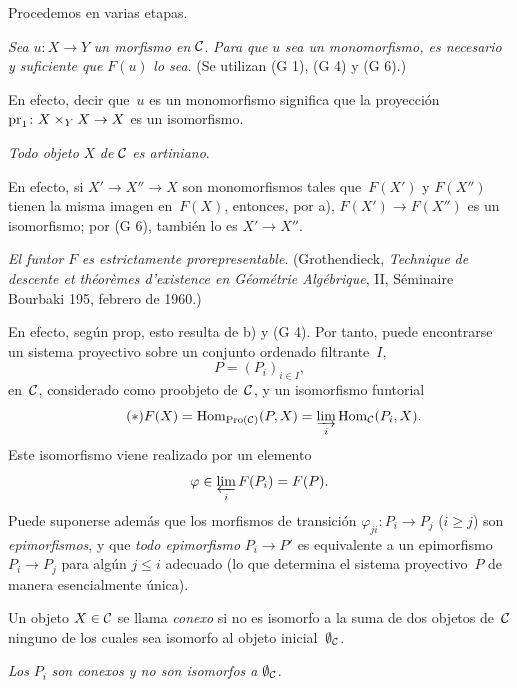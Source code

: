 Procedemos en varias etapas.
\begin{enumerateb}
\item[a)] \emph{Sea} $u\colon X\to Y$ \emph{un morfismo en} $\cal{C}$.
\emph{Para que} $u$ \emph{sea un monomorfismo, es necesario y suficiente que}
$F(u)$ \emph{lo sea}. (Se utilizan (G 1), (G 4) y (G 6).)

En efecto, decir que~$u$ es un monomorfismo significa que la proyección
$\pr_1\colon X\times_YX\to X$ es un isomorfismo.

\item[b)] \emph{Todo objeto} $X$ \emph{de} $\cal{C}$ \emph{es artiniano}.

En efecto, si $X'\to X''\to X$ son monomorfismos tales que~$F(X')$ y
$F(X'')$ tienen la misma imagen en~$F(X)$, entonces, por a),
$F(X')\to F(X'')$ es un isomorfismo; por (G 6), también lo es
$X'\to X''$.

\item[c)] \emph{El funtor} $F$ \emph{es estrictamente prorepresentable}.
(\cf Grothendieck, \emph{Technique de descente et théorèmes d'existence en
Géométrie Algébrique}, II, Séminaire Bourbaki 195, febrero de 1960.)

En efecto, según \loccit prop\ptbl {}, esto resulta de b) y (G 4).
Por tanto, puede encontrarse un sistema proyectivo sobre un conjunto ordenado
filtrante~$I$,
$$
P=(P_i)_{i\in I},
$$
%
en~$\cal{C}$, considerado como proobjeto de~$\cal{C}$, y un isomorfismo
funtorial
\begin{equation*}
\label{eq:V.4.*}\tag{$*$}
F(X)=\Hom_{\Pro(\cal{C})}(P,X)=\varinjlim_i\Hom_{\cal{C}}(P_i,X).
\end{equation*}
Este isomorfismo viene realizado por un elemento
$$
\varphi\in\varprojlim_iF(P_i)=F(P).
$$
Puede suponerse además que los morfismos de transición
$\varphi_{ji}\colon P_i\to P_j$ ($i\geq j$) son
\emph{epimorfismos}, y que \emph{todo epimorfismo} $P_i\to P'$ es
equivalente a un epimorfismo $P_i\to P_j$ para algún $j\leq i$ adecuado
(lo que determina el sistema proyectivo~$P$ de manera esencialmente única).

Un objeto $X\in\cal{C}$ se llama \emph{conexo}
%
si no es isomorfo a la suma de dos objetos de~$\cal{C}$ ninguno de los cuales
sea isomorfo al objeto inicial~$\emptyset_{\cal{C}}$.

\item[d)] \emph{Los} $P_i$ \emph{son conexos y no son isomorfos a}
$\emptyset_{\cal{C}}$.


\end{enumerateb}
